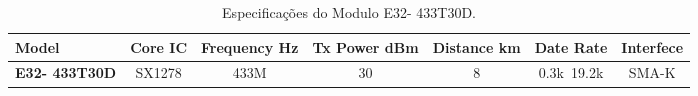 \begin{table}[!htb]
	\centering
	\caption{\label{tab:radioLora} Especificações do Modulo E32- 433T30D.}
	\begin{adjustbox}{max width=\textwidth}
        \begin{tabular}{@{} p{2cm} |c|c|c|c|c|c}
		\toprule
		\textbf{Model} & \textbf{Core IC} & \textbf{Frequency Hz} & \textbf{Tx Power dBm} & \textbf{Distance km} & \textbf{Date Rate} & \textbf{Interfece}\\ \hline

		\textbf{E32- 433T30D} &
			SX1278 & 433M & 30 & 8 & 0.3k~19.2k & SMA-K

		\\ \bottomrule
	\end{tabular}
	\end{adjustbox}
\end{table}










